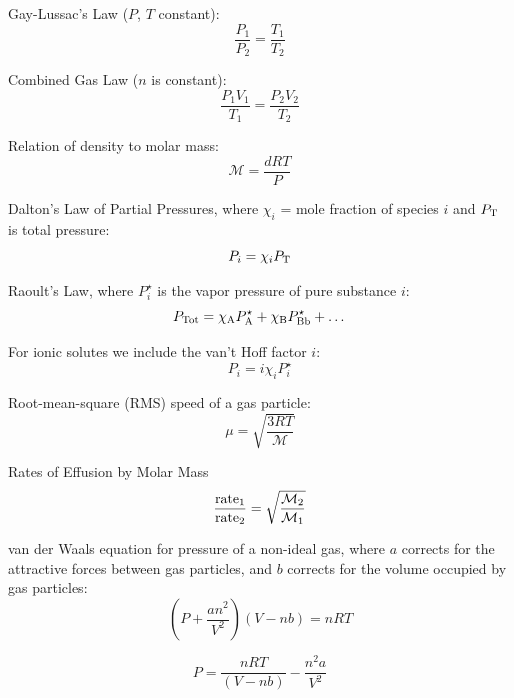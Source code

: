 \documentclass[10pt]{article}
\def\MM{\mathcal{M}}
\begin{document}
Gay-Lussac's Law ($P$, $T$ constant):
\begin{equation*}
\frac{P_1}{P_2} = \frac{T_1}{T_2} 
\end{equation*}

Combined Gas Law ($n$ is constant):
\begin{equation*}
\frac{P_1V_1}{T_1} = \frac{P_2V_2}{T_2}
\end{equation*}

Relation of density to molar mass:
\begin{equation*}
\MM = \frac{dRT}{P}
\end{equation*}

Dalton's Law of Partial Pressures, where $\chi_i$ = mole fraction of species $i$ and $P_\textnormal{T}$ is total pressure:
\begin{equation*}
P_i=\chi_iP_\textnormal{T}
\end{equation*} 

Raoult's Law, where $P_i^\star$ is the vapor pressure of pure substance $i$:
\begin{equation*}
P_\textnormal{Tot}=\chi_\textnormal{A}P_\textnormal{A}^\star + \chi_\textnormal{B}P_\textnormal{Bb}^\star + \dots
\end{equation*}

For ionic solutes we include the van't Hoff factor $i$:
\begin{equation*}
P_i=i\chi_iP_i^\star
\end{equation*}

Root-mean-square (RMS) speed of a gas particle:
\begin{equation*}
\mu = \sqrt{\frac{3RT}{\MM}}
\end{equation*}

Rates of Effusion by Molar Mass
\begin{equation*}
\frac{\textnormal{rate}_1}{\textnormal{rate}_2} = \sqrt{\frac{\MM_2}{\MM_1}}
\end{equation*}

van der Waals equation for pressure of a non-ideal gas, where $a$ corrects for the attractive forces between gas particles, and $b$ corrects for the volume occupied by gas particles:
\begin{equation*}
\left(P+\frac{an^2}{V^2}\right)(V-nb)=nRT
\end{equation*}

\begin{equation*}
P = \frac{nRT}{(V-nb)} - \frac{n^2a}{V^2}
\end{equation*}
\end{document}
